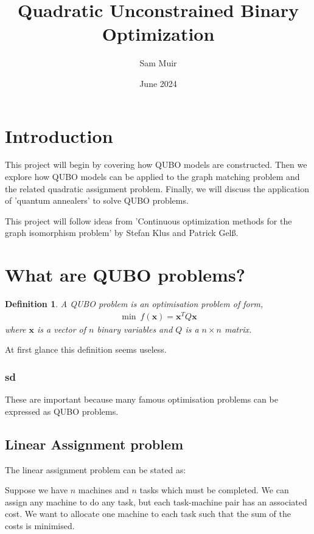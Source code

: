 \documentclass{article}
\title{Quadratic Unconstrained Binary Optimization}
\author{Sam Muir }
\date{June 2024}
\newtheorem{defn}[prop]{Definition}
\begin{document}
\maketitle

\section{Introduction}

This project will begin by covering how QUBO models are constructed. Then we explore how QUBO models can be applied to the graph matching problem and the related quadratic assignment problem. Finally, we will discuss the application of 'quantum annealers' to solve QUBO problems. 

This project will follow ideas from 'Continuous optimization methods for the graph isomorphism problem' by Stefan Klus and Patrick Gelß.

\section{What are QUBO problems?}
\begin{defn}
A QUBO problem is an optimisation problem of form, 
\begin{align*}
    \min \: f(\mathbf{x}) = \mathbf{x}^T Q \mathbf{x}
\end{align*}
where \(\mathbf{x}\) is a vector of \(n\) binary variables and \(Q\) is a \(n \times n\) matrix.
\end{defn}

\noindent At first glance this definition seems useless.
\subsubsection{sd}

These are important because many famous optimisation problems can be expressed as QUBO problems. 

\subsection{Linear Assignment problem}

The linear assignment problem can be stated as:

Suppose we have \(n\) machines and \(n\) tasks which must be completed. We can assign any machine to do any task, but each task-machine pair has an associated cost. We want to allocate one machine to each task such that the sum of the costs is minimised. \\
\end{document}
